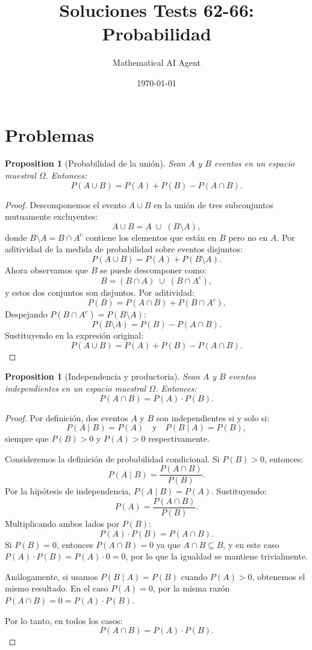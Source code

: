 \documentclass[11pt,a4paper]{article}
\title{Soluciones Tests 62-66: Probabilidad}
\author{Mathematical AI Agent}
\date{\today}
\theoremstyle{plain}
\newtheorem{proposition}[theorem]{Proposition}
\theoremstyle{definition}
\begin{document}
\maketitle
\section{Problemas}

\begin{proposition}[Probabilidad de la unión]
Sean $A$ y $B$ eventos en un espacio muestral $\Omega$. Entonces:
\[
P(A \cup B) = P(A) + P(B) - P(A \cap B).
\]
\end{proposition}

\begin{proof}
Descomponemos el evento $A \cup B$ en la unión de tres subconjuntos mutuamente excluyentes:
\[
A \cup B = A \;\cup\; (B \setminus A),
\]
donde $B \setminus A = B \cap A^c$ contiene los elementos que están en $B$ pero no en $A$. Por aditividad de la medida de probabilidad sobre eventos disjuntos:
\[
P(A \cup B) = P(A) + P(B \setminus A).
\]
Ahora observamos que $B$ se puede descomponer como:
\[
B = (B \cap A) \;\cup\; (B \cap A^c),
\]
y estos dos conjuntos son disjuntos. Por aditividad:
\[
P(B) = P(A \cap B) + P(B \cap A^c).
\]
Despejando $P(B \cap A^c) = P(B \setminus A)$:
\[
P(B \setminus A) = P(B) - P(A \cap B).
\]
Sustituyendo en la expresión original:
\[
P(A \cup B) = P(A) + P(B) - P(A \cap B).
\]
\end{proof}

\begin{proposition}[Independencia y productoria]
Sean $A$ y $B$ eventos independientes en un espacio muestral $\Omega$. Entonces:
\[
P(A \cap B) = P(A) \cdot P(B).
\]
\end{proposition}

\begin{proof}
Por definición, dos eventos $A$ y $B$ son independientes si y solo si:
\[
P(A \mid B) = P(A) \quad \text{y} \quad P(B \mid A) = P(B),
\]
siempre que $P(B) > 0$ y $P(A) > 0$ respectivamente.

Consideremos la definición de probabilidad condicional. Si $P(B) > 0$, entonces:
\[
P(A \mid B) = \frac{P(A \cap B)}{P(B)}.
\]
Por la hipótesis de independencia, $P(A \mid B) = P(A)$. Sustituyendo:
\[
P(A) = \frac{P(A \cap B)}{P(B)}.
\]
Multiplicando ambos lados por $P(B)$:
\[
P(A) \cdot P(B) = P(A \cap B).
\]
Si $P(B) = 0$, entonces $P(A \cap B) = 0$ ya que $A \cap B \subseteq B$, y en este caso $P(A) \cdot P(B) = P(A) \cdot 0 = 0$, por lo que la igualdad se mantiene trivialmente.

Análogamente, si usamos $P(B \mid A) = P(B)$ cuando $P(A) > 0$, obtenemos el mismo resultado. En el caso $P(A) = 0$, por la misma razón $P(A \cap B) = 0 = P(A) \cdot P(B)$.

Por lo tanto, en todos los casos:
\[
P(A \cap B) = P(A) \cdot P(B).
\]
\end{proof}
\end{document}

